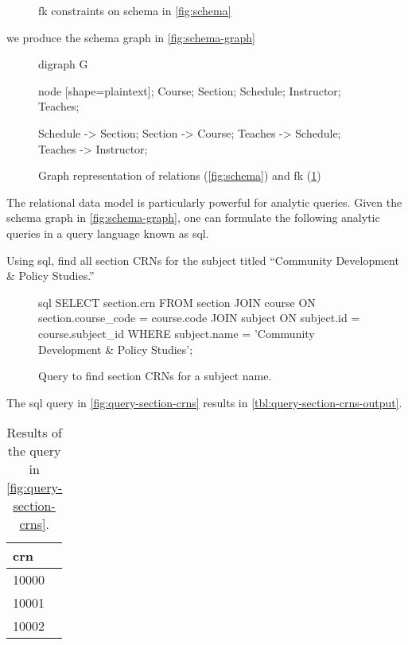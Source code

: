 \begin{ex}
\begin{figure}[H]
				\caption{\gls{fk} constraints on schema in \vref{fig:schema}}
				\label{eqn:fk-constraints}
			\end{figure}
			
			we produce the schema graph in \vref{fig:schema-graph}
			
			\begin{figure}[H]
				\centering
				
				\begin{dot2tex}[neato]
					digraph G {
						node [shape=plaintext]; Course; Section; Schedule; Instructor; Teaches;
						
						Schedule -> Section;
						Section -> Course;
						Teaches -> Schedule;
						Teaches -> Instructor;
					}
				\end{dot2tex}
				
				\caption{Graph representation of relations (\cref{fig:schema}) and \gls{fk} (\cref{eqn:fk-constraints})}
				\label{fig:schema-graph}
			\end{figure}
		\end{ex}
		
		The relational data model is particularly powerful for analytic queries.  Given the schema graph in \vref{fig:schema-graph}, one can formulate the following analytic queries in a query language known as \gls{sql}.
			
		\begin{ex}
			Using \gls{sql}, find all section CRNs for the subject titled ``Community Development \& Policy Studies.''
			
			\begin{figure}[H]
				\begin{singlespaced}
					\begin{pygments}{sql}
SELECT section.crn
FROM   section 
       JOIN course 
         ON section.course_code = course.code 
       JOIN subject 
         ON subject.id = course.subject_id 
WHERE  subject.name = 'Community Development & Policy Studies'; 
					\end{pygments}
				\end{singlespaced}
				
				\caption{Query to find section CRNs for a subject name.}
				\label{fig:query-section-crns}
			\end{figure}
			
			The \gls{sql} query in \vref{fig:query-section-crns} results in \vref{tbl:query-section-crns-output}.
			
			\begin{table}[H]
				\centering
				
				\begin{tabular}{l}
					\toprule
					crn \\
					\midrule
					10000 \\
					10001 \\
					10002 \\
					\bottomrule
				\end{tabular}
				
				\caption{Results of the query in \vref{fig:query-section-crns}.}
				\label{tbl:query-section-crns-output}
			\end{table}
		\end{ex}
		
